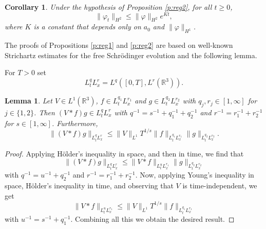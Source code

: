 \documentclass[11pt,a4paper]{scrartcl} %
\newtheorem{cor}[thm]{Corollary}
\newtheorem{lem}[thm]{Lemma}
\newcommand{\R}{\mathds{R}}
\begin{document}
\begin{cor}
  \label{c:reg2}
  Under the hypothesis of Proposition \ref{p:reg2}, for all $t \ge 0$,
  \begin{displaymath}
    \| \varphi_t \|_{H^2} \le \| \varphi \|_{H^2} e^{Kt},
  \end{displaymath}
  where $K$ is a constant that depends only on $a_0$ and $\| \varphi
  \|_{H^1}$.
\end{cor}


The proofs of Propositions \ref{p:reg1} and \ref{p:reg2} are based on
well-known Strichartz estimates for the free Schr\"odinger evolution and the
following lemma.


For $T > 0$ set
\begin{displaymath}
  L_t^q L_x^r = L^q([0,T], L^r(\R^3)).
\end{displaymath}


\begin{lem}
  \label{l:interp}
  Let $V \in L^1(\R^3)$, $f \in L_t^{q_1} L_x^{r_1}$ and $g \in L_t^{q_2}
  L_x^{r_2}$ with $q_j, r_j \in [1,\infty]$ for $j \in \{1,2\}$. Then $(V * f)
  g \in L_t^q L_x^r$ with $q^{-1} = s^{-1} + q_1^{-1} + q_2^{-1}$ and $r^{-1}
  = r_1^{-1} + r_2^{-1}$ for $s \in [1, \infty]$. Furthermore,
  \begin{displaymath}
    \| (V * f)g \|_{L_t^q L_x^r} \le \| V \|_{L^1} T^{1/s} \| f \|_{L_t^{q_1}
    L_x^{r_1}} \| g \|_{L_t^{q_2} L_x^{r_2}}.
  \end{displaymath}
\end{lem}


\begin{proof}
  Applying H\"older's inequality in space, and then in time, we find that
  \begin{displaymath}
    \| (V * f) g \|_{L_t^q L_x^r} \le \| V * f \|_{L_t^u L_x^{r_1}} \| g
    \|_{L_t^{q_2} L_x^{r_2}}
  \end{displaymath}
  with $q^{-1} = u^{-1} + q_2^{-1}$ and $r^{-1} = r_1^{-1} + r_2^{-1}$. Now,
  applying Young's inequality in space, H\"older's inequality in time, and
  observing that $V$ is time-independent, we get
  \begin{displaymath}
    \| V * f \|_{L_t^u L_x^{r_1}} \le \| V \|_{L^1} T^{1/s} \| f \|_{L_t^{q_1}
    L_x^{r_1}}
  \end{displaymath}
  with $u^{-1} = s^{-1} + q_1^{-1}$. Combining all this we obtain the desired
  result.
\end{proof}
\end{document}
